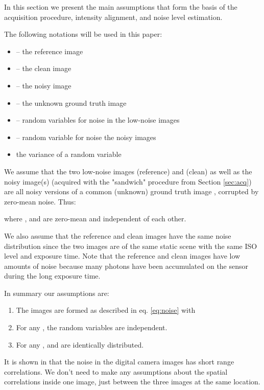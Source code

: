 \documentclass[review]{elsarticle}
\begin{document}
In this section we present the main assumptions that form the basis of the acquisition procedure, intensity alignment, and noise level estimation.

The following notations will be used in this paper:
\begin{itemize}
\item  -- the reference image
\item  -- the clean image
\item   -- the noisy image
\item  -- the unknown ground truth image
\item  -- random variables for noise in the low-noise images
\item  -- random variable for noise the noisy images
\item  the variance of a random variable 
\end{itemize}
 We assume that the two low-noise images  (reference)  and  (clean) as well as the noisy image(s)  (acquired with the "sandwich" procedure from Section \ref{sec:acq}) are all noisy versions of a common (unknown) ground truth image , corrupted by zero-mean noise. Thus:

where , and  are zero-mean and independent of each other.

 We also assume that the reference and clean images have the same noise distribution since the two images are of the same static scene with the same ISO level and exposure time. Note that the reference and clean images have low amounts of noise because many photons have been accumulated on the sensor during the long exposure time. 

 In summary our assumptions are:
 \begin{enumerate}
 \item The images are formed as described in eq. \eqref{eq:noise} with 
 
 \item  For any , the random variables  are independent.
 \item For any ,  and  are identically distributed.
 \end{enumerate} 
 
 It is shown in \cite{NoiseEstimation} that the noise in the digital camera images has short range correlations. 
 We don't need to make any assumptions about the spatial correlations inside one image, just between the three images at the same location.
 
\end{document}
